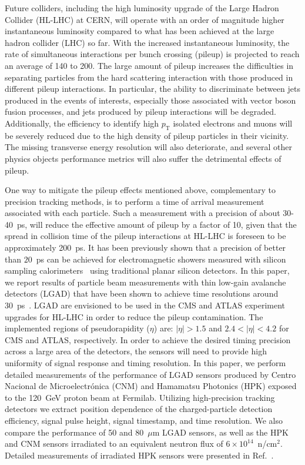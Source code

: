\documentclass[preprint,1p]{elsarticle}
\begin{document}
Future colliders, including the high luminosity upgrade of the Large Hadron
Collider (HL-LHC) at CERN, will operate with an order of magnitude higher
instantaneous luminosity compared to what has been achieved at the
large hadron collider (LHC) so far.
With the increased instantaneous luminosity, the rate of simultaneous
interactions per bunch crossing (pileup) is projected to reach an average of 140
to 200. The large amount of pileup increases the difficulties in separating 
particles from the hard scattering interaction with those
produced in different pileup interactions. In particular, the ability to discriminate between
jets produced in the events of interests, especially those associated with vector 
boson fusion processes, and jets produced by pileup interactions will be
degraded. Additionally, the efficiency to identify high $p_{\mathrm{T}}$ isolated electrons
and muons will be severely reduced due to the high density of pileup particles
in their vicinity. The missing transverse energy resolution will also deteriorate, and several
other physics objects performance metrics will also suffer the
detrimental effects of pileup.


One way to mitigate the pileup effects mentioned above, complementary to precision
tracking methods, is to perform a time of arrival measurement associated with
each particle. Such a measurement with a precision of about 30-40~\si{ps}, will
reduce the effective amount of pileup by a factor of 10, given that the spread
in collision time of the pileup interactions at HL-LHC is foreseen to be
approximately 200~\si{ps}. It has been previously shown that a precision of better than
$20$~\si{ps} can be achieved for electromagnetic showers measured with silicon
sampling calorimeters~\cite{Apresyan201662,Apresyan2017_NSSMIC,AKCHURIN201731}
using traditional planar silicon detectors. In this paper, we report results of
particle beam measurements with thin low-gain avalanche detectors (LGAD) that have
been shown to achieve time resolutions around 30~\si{ps}~\cite{Cartiglia201783, PELLEGRINI201412}. LGAD
are envisioned to be used in the CMS and ATLAS experiment upgrades for HL-LHC in
order to reduce the pileup contamination. The implemented regions of
pseudorapidity ($\eta$) are:
$|\eta|>1.5$ and $2.4 < |\eta| < 4.2 $ for CMS and ATLAS, respectively. In order to achieve
the desired timing precision across a large area of the detectors, the
sensors will need to provide high uniformity of signal response and timing
resolution. In this paper, we perform detailed measurements of the performance of
LGAD sensors produced by Centro Nacional de Microelectr\'{o}nica (CNM) and
Hamamatsu Photonics (HPK) exposed to the 120~GeV proton beam at Fermilab.
Utilizing high-precision tracking detectors we extract position dependence of
the charged-particle detection efficiency, signal pulse height, signal
timestamp, and time resolution. We also compare the performance of 
50 and 80~$\mu$m LGAD sensors, as well as the HPK and CNM sensors irradiated to 
an equivalent neutron flux of $6\times 10^{14}$~n/cm$^2$. Detailed measurements of
irradiated HPK sensors were presented in Ref.~\cite{Galloway:2017gfx}.
\end{document}
